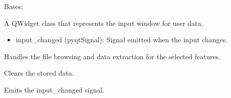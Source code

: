 \documentclass[a4paper,10pt,english]{sphinxmanual}
\begin{document}
\begin{fulllineitems}
\label{\detokenize{gui:src.gui.input_window.InputWindow}}
\pysigstartsignatures
{}
\pysigstopsignatures
\sphinxAtStartPar
Bases: 

\sphinxAtStartPar
A QWidget class that represents the input window for user data.
\begin{description}
\begin{itemize}
\item {} 
\sphinxAtStartPar
input\_changed (pyqtSignal): Signal emitted when the input changes.

\end{itemize}

\end{description}

\begin{fulllineitems}
\label{\detokenize{gui:src.gui.input_window.InputWindow.browse_file}}
\pysigstartsignatures
{}
\pysigstopsignatures
\sphinxAtStartPar
Handles the file browsing and data extraction for the selected features.

\end{fulllineitems}


\begin{fulllineitems}
\label{\detokenize{gui:src.gui.input_window.InputWindow.clear_data}}
\pysigstartsignatures
{}
\pysigstopsignatures
\sphinxAtStartPar
Clears the stored data.

\end{fulllineitems}


\begin{fulllineitems}
\label{\detokenize{gui:src.gui.input_window.InputWindow.emit_input_changed}}
\pysigstartsignatures
{}
\pysigstopsignatures
\sphinxAtStartPar
Emits the input\_changed signal.


\end{fulllineitems}
\end{fulllineitems}
\end{document}
